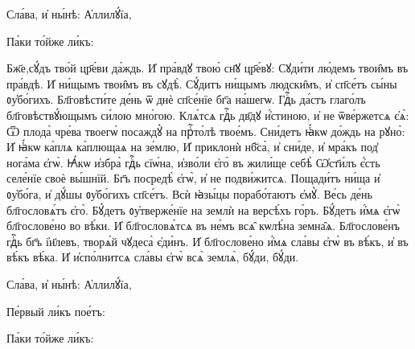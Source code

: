 \hKv Сла́ва, и҆ ны́нѣ: А҆ллилꙋ́їа,   



%
Па́ки то́йже ли́къ: 

\cuLettrine
Бж҃е,\hKv сꙋ́дъ тво́й цр҃е́ви да́ждь. 
\hKv И҆ пра́вдꙋ твою̀  сн҃ꙋ цр҃е́вꙋ: 
\hKv Сꙋди́ти лю́демъ твои̑мъ въ пра́вдѣ. 
\hKv  И҆ ни́щымъ твои̑мъ въ сꙋдѣ̀. 
\hKv Сꙋ́дитъ ни́щымъ  людски̑мъ, и҆ сп҃се́тъ сы́ны ᲂу҆бо́гихъ. 
\hKv  Бл҃говѣсти́те де́нь ѿ днѐ сп҃се́нїе бг҃а на́шегѡ. 
\hKv  Гдⷭ҇ь да́стъ глаго́лъ бл҃говѣствꙋ́ющымъ си́лою мно́гою.  
\hKv Клѧ́тсѧ гдⷭ҇ь дв҃дꙋ и҆́стиною, и҆ не ѿве́ржетсѧ  є҆ѧ̀: 
\hKv Ѿ плода̀ чре́ва твоегѡ̀ посаждꙋ̀ на прⷭ҇то́лѣ  твое́мъ. 
\hKv Сни́детъ ꙗ҆́кѡ до́ждь на рꙋно̀: 
\hKv И҆  ꙗ҆́кѡ ка́плѧ ка́плющаѧ на зе́млю, 
\hKv И҆ приклонѝ нб҃са̀,  и҆ сни́де, и҆ мра́къ под̾ нога́ма є҆гѡ̀. 
\hKv Ꙗ҆́кѡ  и҆збра̀ гдⷭ҇ь сїѡ́на, и҆зво́ли є҆го̀ въ жили́ще себѣ̀ 
\hKv  Ѡ҆ст҃и́лъ  є҆́сть селе́нїе  своѐ вы́шнїй. 
\hKv Бг҃ъ посредѣ̀ є҆гѡ̀, и҆ не  подви́житсѧ. 
\hKv Пощади́тъ ни́ща и҆ ᲂу҆бо́га, и҆ дꙋ́шы  ᲂу҆бо́гихъ сп҃се́тъ. 
\hKv Всѝ ꙗ҆зы́цы порабо́таютъ  є҆мꙋ̀. 
\hKv Ве́сь де́нь бл҃гословѧ́тъ є҆го̀. 
\hKv Бꙋ́детъ  ᲂу҆тверже́нїе на землѝ на версѣ́хъ го́ръ. 
\hKv Бꙋ́детъ  и҆́мѧ є҆гѡ̀ бл҃гослове́но во вѣ́ки. 
\hKv И҆ бл҃гословѧ́тсѧ  въ не́мъ всѧ̑ кѡлѣ́на земна̑ѧ. 
\hKv Бл҃гослове́нъ гдⷭ҇ь  бг҃ъ і҆и҃левъ, творѧ́й чꙋдеса̀ є҆ди́нъ. 
\hKv И҆  бл҃гослове́но и҆́мѧ сла́вы є҆гѡ̀ въ вѣ́къ, и҆ въ вѣ́къ  вѣ́ка. 
\hKv И҆ и҆спо́лнитсѧ сла́вы є҆гѡ̀ всѧ̀ землѧ̀,  бꙋ́ди, бꙋ́ди. 

\hKv Сла́ва, и҆ ны́нѣ: А҆ллилꙋ́їа,  

%
Пе́рвый ли́къ пое́тъ: 

%
Па́ки то́йже ли́къ: 

